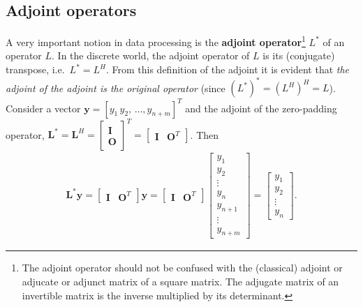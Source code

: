\subsection{Adjoint operators}
A very important notion in data processing is the \textbf{adjoint operator}\footnote{The adjoint operator should not be confused with the (classical) adjoint or adjucate or adjunct matrix of a square matrix. The adjugate matrix of an invertible matrix is the inverse multiplied by its determinant. } $L^*$ of an operator $L$. In the discrete world, the adjoint operator of $L$ is its (conjugate) transpose, i.e.~$L^*=L^H$. From this definition of the adjoint it is evident that {\it the adjoint of the adjoint is the original operator }(since $(L^*)^*=(L^H)^H=L$). Consider a vector $\mathbf{y}=[y_1\,y_2,\,\ldots,y_{n+m}]^T$ and the adjoint of the zero-padding operator, $\mathbf{L}^*=\mathbf{L}^H=\begin{bmatrix}\mathbf{I}\\\mathbf{O}\end{bmatrix}^T=\begin{bmatrix}\mathbf{I} & \mathbf{O}^T\end{bmatrix}$. Then
\begin{gather*}
    \mathbf{L}^{*}\mathbf{y} = \begin{bmatrix}\mathbf{I} & \mathbf{O}^T\end{bmatrix}\mathbf{y}
                     = \begin{bmatrix}\mathbf{I} & \mathbf{O}^T\end{bmatrix}
                       \begin{bmatrix}y_1\\y_2\\\vdots \\y_n\\y_{n+1}\\\vdots\\y_{n+m}\end{bmatrix}
                     = \begin{bmatrix}y_1\\y_2\\\vdots \\y_n\end{bmatrix}.
\end{gather*}
